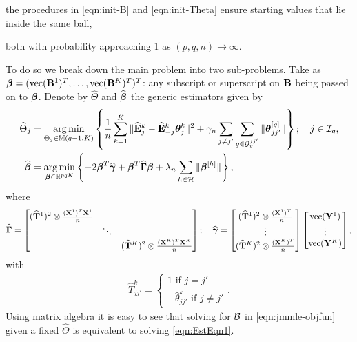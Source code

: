  the procedures in \eqref{eqn:init-B} and \eqref{eqn:init-Theta} ensure starting values that lie inside the same ball,
%

\vspace{1em}
\noindent both with probability approaching 1 as $(p,q,n) \rightarrow \infty$.

To do so we break down the main problem into two sub-problems. Take as ${\boldsymbol{\beta}} = (\operatorname*{vec} ({\mathbf{B}}^1)^T, \ldots, \operatorname*{vec}({\mathbf{B}}^K)^T)^T$: any subscript or superscript on ${\mathbf{B}}$ being passed on to ${\boldsymbol{\beta}}$. Denote by $\widehat \Theta$ and $\widehat {{\boldsymbol{\beta}}}$ the generic estimators given by
%
\begin{align}
\widehat \Theta_j &= \operatorname*{arg\,min}_{\Theta_j \in {\mathbb{M}}(q-1, K)} \left\{ \frac{1}{n} \sum_{k=1}^K \| \widehat {{\mathbf{E}}}^k_j - \widehat {{\mathbf{E}}}^k_{-j} {\boldsymbol{\theta}}_j^k \|^2 + \gamma_n \sum_{j \neq j'} \sum_{g \in {\cal{G}}_y^{jj'}} \| {\boldsymbol{\theta}}_{jj'}^{[g]} \| \right\};
\quad j \in {\cal{I}}_q, \label{eqn:EstEqn2}\\
\widehat {{\boldsymbol{\beta}}} &= \operatorname*{arg\,min}_{{\boldsymbol{\beta}} \in {\mathbb{R}}^{pqK}} \left\{-2 {\boldsymbol{\beta}}^T \widehat {{\boldsymbol{\gamma}}} + {\boldsymbol{\beta}}^T \widehat {{\boldsymbol{\Gamma}}} {\boldsymbol{\beta}} + \lambda_n \sum_{h \in {\cal{H}}} \| {\boldsymbol{\beta}}^{[h]}  \| \right\}, \label{eqn:EstEqn1}
\end{align}
%
where
%
$$
\widehat {{\boldsymbol{\Gamma}}} = \begin{bmatrix}
(\widehat {{\mathbf{T}}}^1)^2 \otimes \frac{({\mathbf{X}}^1)^T {\mathbf{X}}^1}{n} & &\\
& \ddots &\\
& & (\widehat {{\mathbf{T}}}^K)^2 \otimes \frac{({\mathbf{X}}^K)^T {\mathbf{X}}^K}{n}
\end{bmatrix}; \quad
\widehat {{\boldsymbol{\gamma}}} = \begin{bmatrix}
(\widehat {{\mathbf{T}}}^1)^2 \otimes \frac{({\mathbf{X}}^1)^T}{n}\\
\vdots\\
(\widehat {{\mathbf{T}}}^K)^2 \otimes \frac{({\mathbf{X}}^K)^T}{n}
\end{bmatrix}
\begin{bmatrix}
\operatorname*{vec} ({\mathbf{Y}}^1)\\
\vdots\\
\operatorname*{vec} ({\mathbf{Y}}^K)
\end{bmatrix},
$$
with 
%
\begin{align}\label{eqn:define-T}
\hat T_{jj'}^k = \begin{cases}
1 \text{ if } j = j'\\
- \hat \theta_{jj'}^k \text{ if } j \neq j'
\end{cases}.
\end{align}
%
Using matrix algebra it is easy to see that solving for ${\cal{B}}$ in \eqref{eqn:jmmle-objfun} given a fixed $\widehat \Theta$ is equivalent to solving \eqref{eqn:EstEqn1}.

